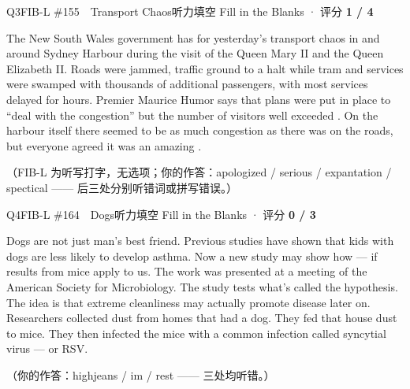\begin{qblock}{Q3\quad FIB-L \#155\ \ Transport Chaos}{听力填空 Fill in the Blanks · 评分 \textcolor{cAccent}{\bfseries 1 / 4}}
\begin{promptbox}
The New South Wales government has  for yesterday's transport chaos in and around Sydney Harbour during the visit of the Queen Mary II and the Queen Elizabeth II. Roads were jammed, traffic ground to a halt while tram and  services were swamped with thousands of additional passengers, with most services delayed for hours. Premier Maurice Humor says that plans were put in place to ``deal with the congestion'' but the number of visitors well exceeded . On the harbour itself there seemed to be as much congestion as there was on the roads, but everyone agreed it was an amazing .
\end{promptbox}
\par{\footnotesize\color{gray}（FIB-L 为听写打字，无选项；你的作答：apologized / serious / expantation / spectical —— 后三处分别听错词或拼写错误。）}
\end{qblock}

\begin{qblock}{Q4\quad FIB-L \#164\ \ Dogs}{听力填空 Fill in the Blanks · 评分 \textcolor{cAccent}{\bfseries 0 / 3}}
\begin{promptbox}
Dogs are not just man's best friend. Previous studies have shown that kids with dogs are less likely to develop asthma. Now a new study may show how --- if results from mice apply to us. The work was presented at a meeting of the American Society for Microbiology. The study tests what's called the  hypothesis. The idea is that extreme cleanliness may actually promote disease later on. Researchers collected dust from homes that had a dog. They fed that house dust to mice. They then infected the mice with a common  infection called  syncytial virus --- or RSV.
\end{promptbox}
\par{\footnotesize\color{gray}（你的作答：highjeans / im / rest —— 三处均听错。）}
\end{qblock}


